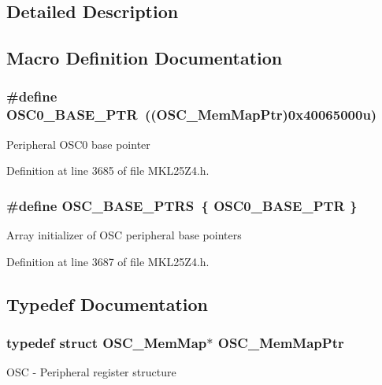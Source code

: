 \subsection{Detailed Description}


\subsection{Macro Definition Documentation}
\subsubsection[{\texorpdfstring{O\+S\+C0\+\_\+\+B\+A\+S\+E\+\_\+\+P\+TR}{OSC0_BASE_PTR}}]{\setlength{\rightskip}{0pt plus 5cm}\#define O\+S\+C0\+\_\+\+B\+A\+S\+E\+\_\+\+P\+TR~(({\bf O\+S\+C\+\_\+\+Mem\+Map\+Ptr})0x40065000u)}\hypertarget{group___o_s_c___peripheral_gaab1618c69a91b2e5d3385139b5b566f0}{}\label{group___o_s_c___peripheral_gaab1618c69a91b2e5d3385139b5b566f0}
Peripheral O\+S\+C0 base pointer 

Definition at line 3685 of file M\+K\+L25\+Z4.\+h.

\subsubsection[{\texorpdfstring{O\+S\+C\+\_\+\+B\+A\+S\+E\+\_\+\+P\+T\+RS}{OSC_BASE_PTRS}}]{\setlength{\rightskip}{0pt plus 5cm}\#define O\+S\+C\+\_\+\+B\+A\+S\+E\+\_\+\+P\+T\+RS~\{ {\bf O\+S\+C0\+\_\+\+B\+A\+S\+E\+\_\+\+P\+TR} \}}\hypertarget{group___o_s_c___peripheral_ga46f69fcb9d660e18b5cbf51adbbcec78}{}\label{group___o_s_c___peripheral_ga46f69fcb9d660e18b5cbf51adbbcec78}
Array initializer of O\+SC peripheral base pointers 

Definition at line 3687 of file M\+K\+L25\+Z4.\+h.



\subsection{Typedef Documentation}
\subsubsection[{\texorpdfstring{O\+S\+C\+\_\+\+Mem\+Map\+Ptr}{OSC_MemMapPtr}}]{\setlength{\rightskip}{0pt plus 5cm}typedef struct {\bf O\+S\+C\+\_\+\+Mem\+Map}$\ast$ {\bf O\+S\+C\+\_\+\+Mem\+Map\+Ptr}}\hypertarget{group___o_s_c___peripheral_gaaa685163f549fdf24c28ec9b400310b5}{}\label{group___o_s_c___peripheral_gaaa685163f549fdf24c28ec9b400310b5}
O\+SC -\/ Peripheral register structure 